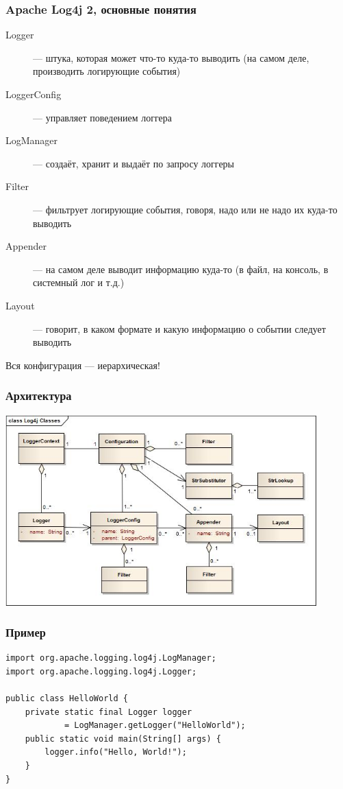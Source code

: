 \documentclass[xetex,mathserif,serif]{beamer}
\begin{document}
	\begin{frame}
		\frametitle{Apache Log4j 2, основные понятия}
		\begin{description}
			\item [Logger] --- штука, которая может что-то куда-то выводить (на самом деле, производить логирующие события)
			\item [LoggerConfig] --- управляет поведением логгера
			\item [LogManager] --- создаёт, хранит и выдаёт по запросу логгеры
			\item [Filter] --- фильтрует логирующие события, говоря, надо или не надо их куда-то выводить
			\item [Appender] --- на самом деле выводит информацию куда-то (в файл, на консоль, в системный лог и т.д.)
			\item [Layout] --- говорит, в каком формате и какую информацию о событии следует выводить
		\end{description}
		\begin{center}Вся конфигурация --- иерархическая!\end{center}
	\end{frame}

	\begin{frame}
		\frametitle{Архитектура}
		\begin{center}
			\includegraphics[width=0.9\textwidth]{log4jClasses.jpg}
		\end{center}
	\end{frame}

	\begin{frame}[fragile]
		\frametitle{Пример}
		\begin{verbatim}
import org.apache.logging.log4j.LogManager;
import org.apache.logging.log4j.Logger;
 
public class HelloWorld {
    private static final Logger logger 
            = LogManager.getLogger("HelloWorld");
    public static void main(String[] args) {
        logger.info("Hello, World!");
    }
}
		\end{verbatim}
\end{frame}
\end{document}
